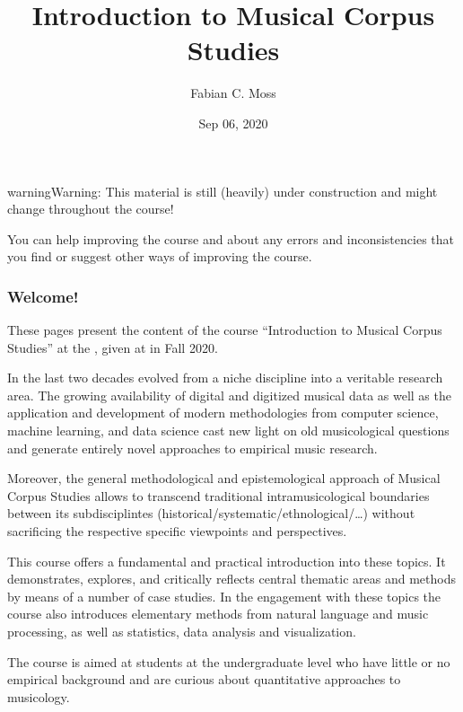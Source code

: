 \documentclass[letterpaper,10pt,english]{sphinxmanual}
\title{Introduction to Musical Corpus Studies}
\date{Sep 06, 2020}
\author{Fabian C.\@{} Moss}
\begin{document}
\pagestyle{empty}
\sphinxmaketitle
\pagestyle{plain}
\sphinxtableofcontents
\pagestyle{normal}
\label{\detokenize{index::doc}}


\begin{sphinxadmonition}{warning}{Warning:}
This material is still (heavily) under construction and might change throughout the course!

You can help improving the course and  about any errors and inconsistencies that you find
or suggest other ways of improving the course.
\end{sphinxadmonition}
\subsubsection*{Welcome!}

These pages present the content of the course “Introduction to Musical Corpus Studies” at the ,
given at  in Fall 2020.

In the last two decades  evolved from a niche discipline into a veritable research area.
The growing availability of digital and digitized musical data as well as the application and development of modern
methodologies from computer science, machine learning, and data science cast new light on old musicological questions
and generate entirely novel approaches to empirical music research.

Moreover, the general methodological and epistemological approach of Musical Corpus Studies allows to transcend traditional
intra\sphinxhyphen{}musicological boundaries between its sub\sphinxhyphen{}disciplintes (historical/systematic/ethnological/…) without sacrificing the
respective specific viewpoints and perspectives.

This course offers a fundamental and practical introduction into these topics.
It demonstrates, explores, and critically reflects central thematic areas and methods by means of a number of case studies.
In the engagement with these topics the course also introduces elementary methods from natural language and music processing,
as well as statistics, data analysis and visualization.

The course is aimed at students at the undergraduate level who have little or no empirical background and are curious
about quantitative approaches to musicology.
\end{document}
